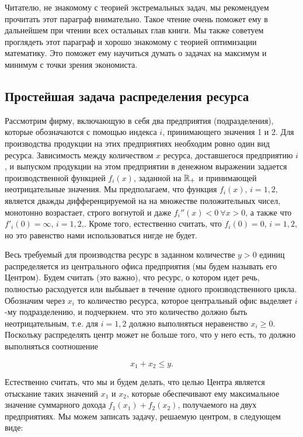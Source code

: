     Читателю, не знакомому с теорией экстремальных задач, мы
    рекомендуем прочитать этот параграф внимательно. Такое чтение
    очень поможет ему в дальнейшем при чтении всех остальных глав книги. Мы также
    советуем проглядеть этот параграф и хорошо знакомому с теорией
    оптимизации математику. Это поможет ему научиться думать о
    задачах на максимум и минимум с точки зрения экономиста.







\subsection{Простейшая задача распределения ресурса}


Рассмотрим фирму, включающую в себя два предприятия (подразделения), которые обозначаются с
помощью  индекса $i$, принимающего значения 1 и 2. Для производства продукции на этих
предприятиях необходим ровно один вид ресурса. Зависимость между количеством $x$ ресурса,
доставшегося предприятию $i$, и выпуском продукции на этом предприятии в денежном выражении
задается производственной функцией $f_i(x)$, заданной на  $\mathbb{R}_+$ и принимающей
неотрицательные значения. Мы предполагаем, что функция $f_{i}(x)$, $i=1,2$, является дважды
дифференцируемой на на множестве положительных чисел, монотонно возрастает, строго вогнутой и
даже $f_{i}''(x)<0 \ \forall x>0$, а также что $f'_{i}(0)=\infty$, $i=1,2$,. Кроме того,
естественно считать, что $f_{i}(0)=0$, $i=1,2$, но это равенство нами использоваться нигде не
будет.

Весь требуемый для производства ресурс в заданном количестве $y>0$
единиц распределяется из центрального офиса предприятия (мы будем
называть его Центром). Будем считать (это важно), что ресурс, о
котором идет речь, полностью расходуется или выбывает в течение
одного производственного цикла. Обозначим через $x_{i}$ то
количество ресурса, которое центральный офис выделяет $i$-му
подразделению, и подчеркнем. что это количество должно быть
неотрицательным, т.е. для $i=1,2$ должно выполняться неравенство
$x_{i}\geqslant0$. Поскольку распределять центр может не больше
того, что у него есть, то должно выполняться соотношение

\[x_{1}+x_{2}\leqslant y.\]

Естественно считать, что мы и будем делать, что целью Центра
является отыскание таких значений $x_{1}$ и $x_{2}$, которые
обеспечивают ему максимальное значение суммарного дохода
$f_{1}(x_{1})+f_{2}(x_{2})$, получаемого на двух предприятиях. Мы
можем записать задачу, решаемую центром, в следующем виде:

